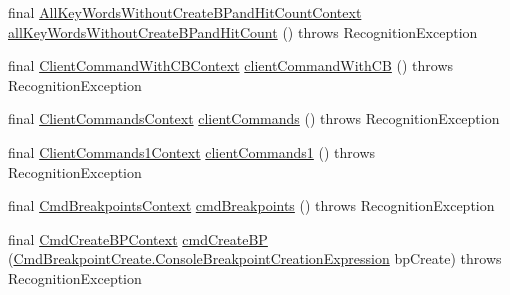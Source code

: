 \begin{DoxyCompactItemize}
\item 
final \hyperlink{classgov_1_1nasa_1_1jpf_1_1inspector_1_1client_1_1parser_1_1_console_grammar_parser_1_1_all_key_5423188b2439879f44801649cdee10f6}{All\+Key\+Words\+Without\+Create\+B\+Pand\+Hit\+Count\+Context} \hyperlink{classgov_1_1nasa_1_1jpf_1_1inspector_1_1client_1_1parser_1_1_console_grammar_parser_aff31036dcee67dbba83def31e4761e4e}{all\+Key\+Words\+Without\+Create\+B\+Pand\+Hit\+Count} ()  throws Recognition\+Exception 
\item 
final \hyperlink{classgov_1_1nasa_1_1jpf_1_1inspector_1_1client_1_1parser_1_1_console_grammar_parser_1_1_client_command_with_c_b_context}{Client\+Command\+With\+C\+B\+Context} \hyperlink{classgov_1_1nasa_1_1jpf_1_1inspector_1_1client_1_1parser_1_1_console_grammar_parser_af370380e1a8bd00a938ccef2cf6a7b1b}{client\+Command\+With\+CB} ()  throws Recognition\+Exception 
\item 
final \hyperlink{classgov_1_1nasa_1_1jpf_1_1inspector_1_1client_1_1parser_1_1_console_grammar_parser_1_1_client_commands_context}{Client\+Commands\+Context} \hyperlink{classgov_1_1nasa_1_1jpf_1_1inspector_1_1client_1_1parser_1_1_console_grammar_parser_a72762b83792e740b30d2732282143634}{client\+Commands} ()  throws Recognition\+Exception 
\item 
final \hyperlink{classgov_1_1nasa_1_1jpf_1_1inspector_1_1client_1_1parser_1_1_console_grammar_parser_1_1_client_commands1_context}{Client\+Commands1\+Context} \hyperlink{classgov_1_1nasa_1_1jpf_1_1inspector_1_1client_1_1parser_1_1_console_grammar_parser_a0516a8d9423ed5170d4896713513569e}{client\+Commands1} ()  throws Recognition\+Exception 
\item 
final \hyperlink{classgov_1_1nasa_1_1jpf_1_1inspector_1_1client_1_1parser_1_1_console_grammar_parser_1_1_cmd_breakpoints_context}{Cmd\+Breakpoints\+Context} \hyperlink{classgov_1_1nasa_1_1jpf_1_1inspector_1_1client_1_1parser_1_1_console_grammar_parser_a05e7399334460971133b1effabd14883}{cmd\+Breakpoints} ()  throws Recognition\+Exception 
\item 
final \hyperlink{classgov_1_1nasa_1_1jpf_1_1inspector_1_1client_1_1parser_1_1_console_grammar_parser_1_1_cmd_create_b_p_context}{Cmd\+Create\+B\+P\+Context} \hyperlink{classgov_1_1nasa_1_1jpf_1_1inspector_1_1client_1_1parser_1_1_console_grammar_parser_abe17248e2be8d9035749fc570f460e1b}{cmd\+Create\+BP} (\hyperlink{classgov_1_1nasa_1_1jpf_1_1inspector_1_1client_1_1commands_1_1_cmd_breakpoint_create_1_1_console_breakpoint_creation_expression}{Cmd\+Breakpoint\+Create.\+Console\+Breakpoint\+Creation\+Expression} bp\+Create)  throws Recognition\+Exception 

\end{DoxyCompactItemize}
